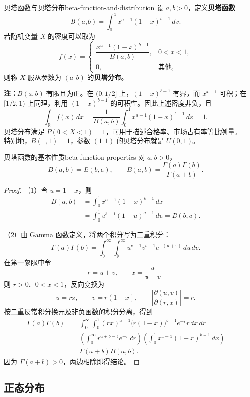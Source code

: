 \begin{mydefinition}{贝塔函数与贝塔分布}{beta-function-and-distribution}
设 $a,b>0$，定义\textbf{贝塔函数}
\[
B(a,b)=\int_0^1x^{a-1}(1-x)^{b-1}\,dx.
\]
若随机变量 $X$ 的密度可以取为
\[
f(x)=
\begin{cases}
\dfrac{x^{a-1}(1-x)^{b-1}}{B(a,b)},&0<x<1,\\[0.5em]
0,&\text{其他},
\end{cases}
\]
则称 $X$ 服从参数为 $(a,b)$ 的\textbf{贝塔分布}。
\end{mydefinition}

\textbf{注：}\quad $B(a,b)$ 有限且为正。在 $(0,1/2]$ 上，$(1-x)^{b-1}$ 有界，而 $x^{a-1}$ 可积；在 $[1/2,1)$ 上同理，利用 $(1-x)^{b-1}$ 的可积性。因此上述密度非负，且
\[
\int_{\mathbb R}f(x)\,dx
=\frac1{B(a,b)}\int_0^1x^{a-1}(1-x)^{b-1}\,dx=1.
\]
贝塔分布满足 $P(0<X<1)=1$，可用于描述合格率、市场占有率等比例量。特别地，$B(1,1)=1$，参数 $(1,1)$ 的贝塔分布就是 $U(0,1)$。

\begin{proposition}{贝塔函数的基本性质}{beta-function-properties}
对 $a,b>0$，
\[
B(a,b)=B(b,a),
\qquad
B(a,b)=\frac{\Gamma(a)\Gamma(b)}{\Gamma(a+b)}.
\]
\end{proposition}

\begin{proof}

（1）令 $u=1-x$，则
\[
\begin{aligned}
B(a,b)
&=\int_0^1x^{a-1}(1-x)^{b-1}\,dx\\
&=\int_0^1u^{b-1}(1-u)^{a-1}\,du=B(b,a).
\end{aligned}
\]

（2）由 Gamma 函数定义，将两个积分写为二重积分：
\[
\Gamma(a)\Gamma(b)
=\int_0^\infty\int_0^\infty
u^{a-1}v^{b-1}e^{-(u+v)}\,du\,dv.
\]
在第一象限中令
\[
r=u+v,\qquad x=\frac{u}{u+v},
\]
则 $r>0$、$0<x<1$，反向变换为
\[
u=rx,\qquad v=r(1-x),
\qquad
\left|\frac{\partial(u,v)}{\partial(r,x)}\right|=r.
\]
按二重反常积分换元及非负函数的积分分离，得到
\[
\begin{aligned}
\Gamma(a)\Gamma(b)
&=\int_0^\infty\int_0^1
(rx)^{a-1}\bigl(r(1-x)\bigr)^{b-1}e^{-r}r\,dx\,dr\\
&=\left(\int_0^\infty r^{a+b-1}e^{-r}\,dr\right)
\left(\int_0^1x^{a-1}(1-x)^{b-1}\,dx\right)\\
&=\Gamma(a+b)B(a,b).
\end{aligned}
\]
因为 $\Gamma(a+b)>0$，两边相除即得结论。
\end{proof}

\subsection*{正态分布}


